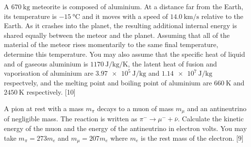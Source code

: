 \begin{problem}
    A $\qty{670}{\kg}$ meteorite is composed of aluminium. At a distance far from the Earth, its temperature is $\qty{-15}{\degreeCelsius}$ and it moves with a speed of $\qty{14.0}{\km\per\s}$ relative to the Earth. As it crashes into the planet, the resulting additional internal energy is shared equally between the meteor and the planet. Assuming that all of the material of the meteor rises momentarily to the same final temperature, determine this temperature. You may also assume that the specific heat of liquid and of gaseous aluminium is $\qty{1170}{\J\per\kg\per\K}$, the latent heat of fusion and vaporisation of aluminium are $\qty{3.97e5}{\J\per\kg}$ and $\qty{1.14e7}{\J\per\kg}$ respectvely, and the melting point and boiling point of aluminium are $\qty{660}{\K}$ and $\qty{2450}{\K}$ respectively.
\hfill{[10]}\end{problem}

\begin{problem}
    A pion at rest with a mass $m_{\pi}$ decays to a muon of mass $m_{\mu}$ and an antineutrino of negligible mass. The reaction is written as $\pi^{-} \rightarrow \mu^{-}+\bar{\nu}$. Calculate the kinetic energy of the muon and the energy of the antineutrino in electron volts. You may take $m_{\pi}=273 m_{e}$ and $m_{\mu}=207 m_{e}$ where $m_{e}$ is the rest mass of the electron.
\hfill{[9]}\end{problem}

